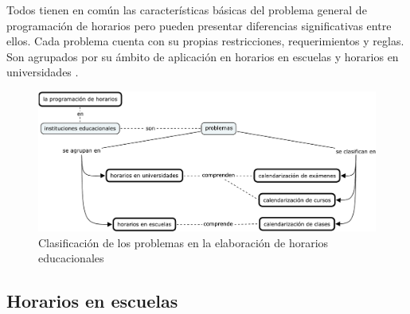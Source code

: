 \documentclass[draft,12pt,headsepline,footsepline,paper=letter]{scrreprt}
\begin{document}
Todos tienen en común las características básicas del problema general de programación de horarios pero pueden presentar diferencias significativas entre ellos. Cada problema cuenta con su propias restricciones, requerimientos y reglas. Son agrupados por su ámbito de aplicación en horarios en escuelas y horarios en universidades \citep[p.~10]{abdullah06heuristic-approaches}.

\begin{figure}[hbtp]
\centering
\includegraphics[width=\textwidth]{timetabling_classification.pdf}
\caption[Clasificación del problema]{Clasificación de los problemas en la elaboración de horarios educacionales}
\label{fig:timetabling_classification}
\end{figure}

\subsection{Horarios en escuelas}

\end{document}
